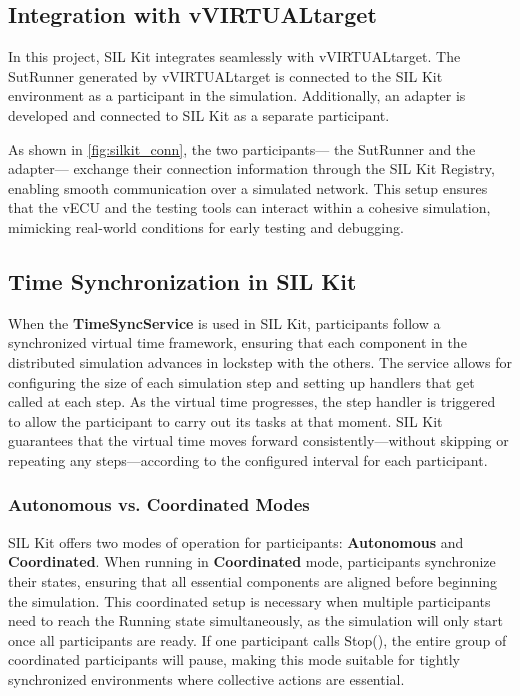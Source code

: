 \subsection{Integration with vVIRTUALtarget}
In this project, SIL Kit integrates seamlessly with vVIRTUALtarget. The SutRunner generated by vVIRTUALtarget is connected to the SIL Kit environment as a participant in the simulation. Additionally, an adapter is developed and connected to SIL Kit as a separate participant.

As shown in \autoref{fig:silkit_conn}, the two participants— the SutRunner and the adapter— exchange their connection information through the SIL Kit Registry, enabling smooth communication over a simulated network. This setup ensures that the vECU and the testing tools can interact within a cohesive simulation, mimicking real-world conditions for early testing and debugging.

\subsection{Time Synchronization in SIL Kit}
When the \textbf{TimeSyncService} is used in SIL Kit, participants follow a synchronized virtual time framework, ensuring that each component in the distributed simulation advances in lockstep with the others. The service allows for configuring the size of each simulation step and setting up handlers that get called at each step. As the virtual time progresses, the step handler is triggered to allow the participant to carry out its tasks at that moment. SIL Kit guarantees that the virtual time moves forward consistently—without skipping or repeating any steps—according to the configured interval for each participant. \cite{sil_kit_docs}

\subsubsection{Autonomous vs. Coordinated Modes}
SIL Kit offers two modes of operation for participants: \textbf{Autonomous} and \textbf{Coordinated}. When running in \textbf{Coordinated} mode, participants synchronize their states, ensuring that all essential components are aligned before beginning the simulation. This coordinated setup is necessary when multiple participants need to reach the Running state simultaneously, as the simulation will only start once all participants are ready. If one participant calls Stop(), the entire group of coordinated participants will pause, making this mode suitable for tightly synchronized environments where collective actions are essential.


